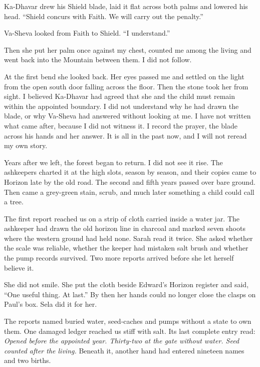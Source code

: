 Ka-Dhavar drew his Shield blade, laid it flat across both palms and lowered his head. ``Shield concurs with Faith. We will carry out the penalty.''\par

Va-Sheva looked from Faith to Shield. ``I understand.''\par

Then she put her palm once against my chest, counted me among the living and went back into the Mountain between them. I did not follow.\par

At the first bend she looked back. Her eyes passed me and settled on the light from the open south door falling across the floor. Then the stone took her from sight. I believed Ka-Dhavar had agreed that she and the child must remain within the appointed boundary. I did not understand why he had drawn the blade, or why Va-Sheva had answered without looking at me. I have not written what came after, because I did not witness it. I record the prayer, the blade across his hands and her answer. It is all in the past now, and I will not reread my own story.\par

\ornament

Years after we left, the forest began to return. I did not see it rise. The ashkeepers charted it at the high slots, season by season, and their copies came to Horizon late by the old road. The second and fifth years passed over bare ground. Then came a grey-green stain, scrub, and much later something a child could call a tree.\par

The first report reached us on a strip of cloth carried inside a water jar. The ashkeeper had drawn the old horizon line in charcoal and marked seven shoots where the western ground had held none. Sarah read it twice. She asked whether the scale was reliable, whether the keeper had mistaken salt brush and whether the pump records survived. Two more reports arrived before she let herself believe it.\par

She did not smile. She put the cloth beside Edward's Horizon register and said, ``One useful thing. At last.'' By then her hands could no longer close the clasps on Paul's box. Sela did it for her.\par

The reports named buried water, seed-caches and pumps without a state to own them. One damaged ledger reached us stiff with salt. Its last complete entry read: \emph{Opened before the appointed year. Thirty-two at the gate without water. Seed counted after the living.} Beneath it, another hand had entered nineteen names and two births.\par


